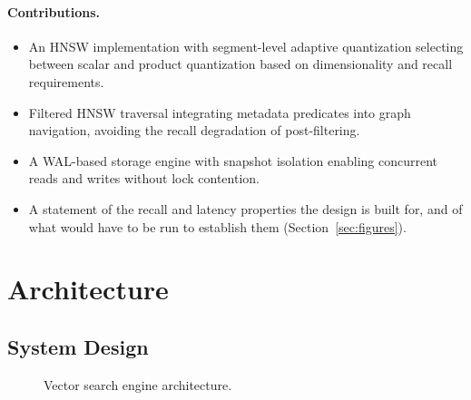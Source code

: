 \documentclass[11pt,twocolumn]{article}
\begin{document}
\paragraph{Contributions.}
\begin{itemize}
    \item An HNSW implementation with segment-level adaptive quantization selecting between scalar and product quantization based on dimensionality and recall requirements.
    \item Filtered HNSW traversal integrating metadata predicates into graph navigation, avoiding the recall degradation of post-filtering.
    \item A WAL-based storage engine with snapshot isolation enabling concurrent reads and writes without lock contention.
    \item A statement of the recall and latency properties the design is built for, and of what would have to be run to establish them (Section~\ref{sec:figures}).
\end{itemize}

\section{Architecture}

\subsection{System Design}

\begin{figure}[t]
\centering
{}
\caption{Vector search engine architecture.}
\label{fig:vector}
\end{figure}
\end{document}
